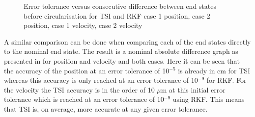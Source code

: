 \begin{figure}[H]
\caption{Error tolerance versus consecutive difference between end states before circularisation for \ac{TSI} and \ac{RKF} \protect{} case 1 position, \protect{} case 2 position, \protect{} case 1 velocity, \protect{} case 2 velocity } 
\label{fig:errorToleranceVsConsecutiveDifferenceCase1RKFTSIpositionSmall} 
\end{figure} 

A similar comparison can be done when comparing each of the end states directly to the nominal end state. The result is a nominal absolute difference graph as presented in  for position and velocity and both cases. Here it can be seen that the accuracy of the position at an error tolerance of 10$^{-5}$ is already in cm for \ac{TSI} whereas this accuracy is only reached at an error tolerance of 10$^{-9}$ for \ac{RKF}. For the velocity the \ac{TSI} accuracy is in the order of 10 $\mu$m at this initial error tolerance which is reached at an error tolerance of 10$^{-9}$ using \ac{RKF}. This means that \ac{TSI} is, on average, more accurate at any given error tolerance.  

